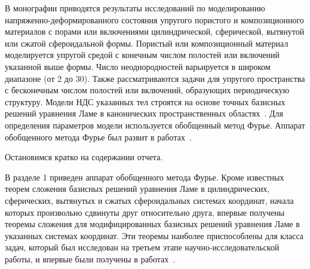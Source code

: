 В монографии приводятся результаты исследований по моделированию на\-пря\-же\-н\-но-де\-фор\-ми\-ро\-ва\-н\-но\-го состояния упругого пористого и композиционного материалов с порами или включениями цилиндрической, сферической, вытянутой или сжатой сфероидальной формы. Пористый или композиционный материал моделируется упругой средой с конечным числом полостей или включений указанной выше формы. Число неоднородностей варьируется в широком диапазоне (от 2 до 30). Также рассматриваются задачи для упругого пространства с бесконечным числом полостей или включений, образующих периодическую структуру.
Модели НДС указанных тел строятся на основе точных базисных решений уравнения Ламе в канонических пространственных областях~\cite{Nikolaev1993, Nikolaev1998, Nikolaev1984}. Для определения параметров модели используется обобщенный метод Фурье. Аппарат обобщенного метода Фурье был развит в работах~\cite{Nikolaev1998, Nikolaev2011, Nikolaev1998-1, Nikolaev1993, Nikolaev1984}.

Остановимся кратко на содержании отчета.

В разделе 1 приведен аппарат обобщенного метода Фурье. Кроме известных теорем сложения базисных решений уравнения Ламе в цилиндрических, сферических, вытянутых и сжатых сфероидальных системах координат, начала которых произвольно сдвинуты друг относительно друга, впервые получены теоремы сложения для модифицированных базисных решений уравнения Ламе в указанных системах координат. Эти теоремы наиболее приспособлены для класса задач, который был исследован на третьем этапе научно-исследовательской работы, и впервые были получены в работах~\cite{Nikolaev2014-1, Nikolaev2014-9}.


